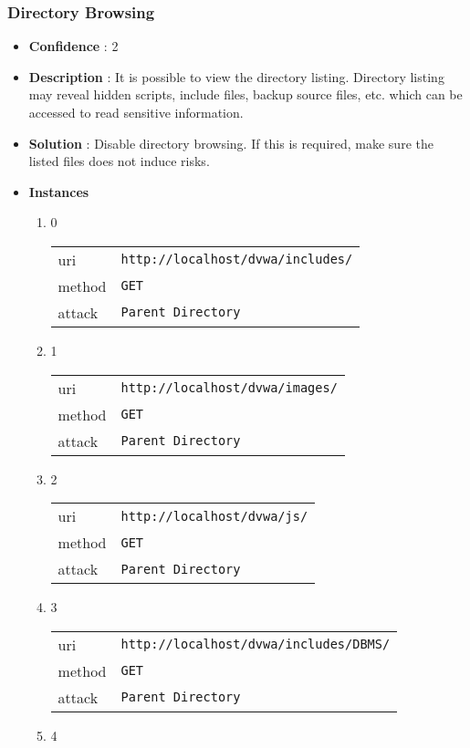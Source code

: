 \documentclass[10pt]{article}
\begin{document}
\subsubsection{Directory Browsing}
\begin{itemize}
\item[] \textbf{Confidence} : 2
\item[] \textbf{Description} : It is possible to view the directory listing.  Directory listing may reveal hidden scripts, include files, backup source files, etc. which can be accessed to read sensitive information.
\item[] \textbf{Solution} :  Disable directory browsing.  If this is required, make sure the listed files does not induce risks.
\item[] \textbf{Instances}
\begin{enumerate}
\item[] 0
\begin{tabular}{| l | p{12cm}}
uri & \texttt{http://localhost/dvwa/includes/} \\
method & \texttt{GET} \\
attack & \texttt{Parent Directory} \\
\end{tabular}
\item[] 1
\begin{tabular}{| l | p{12cm}}
uri & \texttt{http://localhost/dvwa/images/} \\
method & \texttt{GET} \\
attack & \texttt{Parent Directory} \\
\end{tabular}
\item[] 2
\begin{tabular}{| l | p{12cm}}
uri & \texttt{http://localhost/dvwa/js/} \\
method & \texttt{GET} \\
attack & \texttt{Parent Directory} \\
\end{tabular}
\item[] 3
\begin{tabular}{| l | p{12cm}}
uri & \texttt{http://localhost/dvwa/includes/DBMS/} \\
method & \texttt{GET} \\
attack & \texttt{Parent Directory} \\
\end{tabular}
\item[] 4
\begin{tabular}{| l | p{12cm}}

\end{tabular}
\end{enumerate}
\end{itemize}
\end{document}
